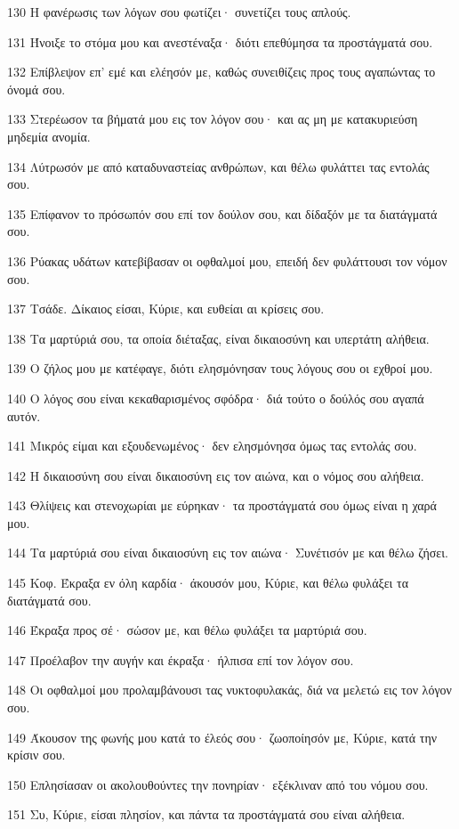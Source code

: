 \par 130 Η φανέρωσις των λόγων σου φωτίζει· συνετίζει τους απλούς.
\par 131 Ήνοιξε το στόμα μου και ανεστέναξα· διότι επεθύμησα τα προστάγματά σου.
\par 132 Επίβλεψον επ' εμέ και ελέησόν με, καθώς συνειθίζεις προς τους αγαπώντας το όνομά σου.
\par 133 Στερέωσον τα βήματά μου εις τον λόγον σου· και ας μη με κατακυριεύση μηδεμία ανομία.
\par 134 Λύτρωσόν με από καταδυναστείας ανθρώπων, και θέλω φυλάττει τας εντολάς σου.
\par 135 Επίφανον το πρόσωπόν σου επί τον δούλον σου, και δίδαξόν με τα διατάγματά σου.
\par 136 Ρύακας υδάτων κατεβίβασαν οι οφθαλμοί μου, επειδή δεν φυλάττουσι τον νόμον σου.
\par 137 Τσάδε. Δίκαιος είσαι, Κύριε, και ευθείαι αι κρίσεις σου.
\par 138 Τα μαρτύριά σου, τα οποία διέταξας, είναι δικαιοσύνη και υπερτάτη αλήθεια.
\par 139 Ο ζήλος μου με κατέφαγε, διότι ελησμόνησαν τους λόγους σου οι εχθροί μου.
\par 140 Ο λόγος σου είναι κεκαθαρισμένος σφόδρα· διά τούτο ο δούλός σου αγαπά αυτόν.
\par 141 Μικρός είμαι και εξουδενωμένος· δεν ελησμόνησα όμως τας εντολάς σου.
\par 142 Η δικαιοσύνη σου είναι δικαιοσύνη εις τον αιώνα, και ο νόμος σου αλήθεια.
\par 143 Θλίψεις και στενοχωρίαι με εύρηκαν· τα προστάγματά σου όμως είναι η χαρά μου.
\par 144 Τα μαρτύριά σου είναι δικαιοσύνη εις τον αιώνα· Συνέτισόν με και θέλω ζήσει.
\par 145 Κοφ. Έκραξα εν όλη καρδία· άκουσόν μου, Κύριε, και θέλω φυλάξει τα διατάγματά σου.
\par 146 Έκραξα προς σέ· σώσον με, και θέλω φυλάξει τα μαρτύριά σου.
\par 147 Προέλαβον την αυγήν και έκραξα· ήλπισα επί τον λόγον σου.
\par 148 Οι οφθαλμοί μου προλαμβάνουσι τας νυκτοφυλακάς, διά να μελετώ εις τον λόγον σου.
\par 149 Άκουσον της φωνής μου κατά το έλεός σου· ζωοποίησόν με, Κύριε, κατά την κρίσιν σου.
\par 150 Επλησίασαν οι ακολουθούντες την πονηρίαν· εξέκλιναν από του νόμου σου.
\par 151 Συ, Κύριε, είσαι πλησίον, και πάντα τα προστάγματά σου είναι αλήθεια.
